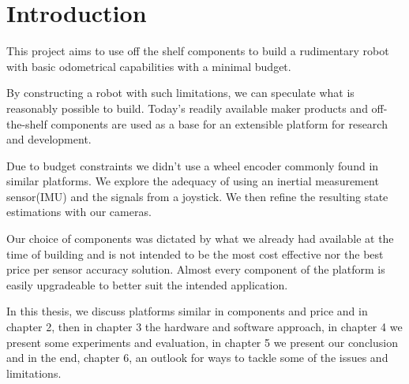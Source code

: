\documentclass[class=report, crop=false]{standalone}
\begin{document}
\chapter{Introduction}\label{cha:introduction}
\pagestyle{scrheadings}
This project aims to use off the shelf components to build a rudimentary robot with basic odometrical capabilities with a minimal budget.

By constructing a robot with such limitations, we can speculate what is reasonably possible to build. Today's readily available maker products and off-the-shelf components are used as a base for an extensible platform for research and development.

Due to budget constraints we didn't use a wheel encoder commonly found in similar platforms. We explore the adequacy of using an inertial measurement sensor(IMU) and the signals from a joystick. We then refine the resulting state estimations with our cameras.

Our choice of components was dictated by what we already had available at the time of building and is not intended to be the most cost effective nor the best price per sensor accuracy solution. Almost every component of the platform is  easily upgradeable to better suit the intended application.

In this thesis, we discuss platforms similar in components and price and in chapter 2, then in chapter 3 the hardware and software approach, in chapter 4 we present some experiments and evaluation, in chapter 5 we present our conclusion and in the end, chapter 6, an outlook for ways to tackle some of the issues and limitations.
\end{document}
